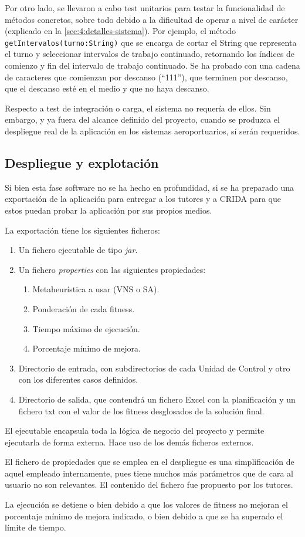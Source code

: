 Por otro lado, se llevaron a cabo test unitarios para testar la funcionalidad de métodos concretos, sobre todo debido a la dificultad de operar a nivel de carácter (explicado en la \autoref{sec:4:detalles-sistema}).
Por ejemplo, el método \texttt{getIntervalos(turno:String)} que se encarga de cortar el String que representa el turno y seleccionar intervalos de trabajo continuado, retornando los índices de comienzo y fin del intervalo de trabajo continuado. Se ha probado con una cadena de caracteres que comienzan por descanso (``111''), que terminen por descanso, que el descanso esté en el medio y que no haya descanso.

Respecto a test de integración o carga, el sistema no requería de ellos. Sin embargo, y ya fuera del alcance definido del proyecto, cuando se produzca el despliegue real de la aplicación en los sistemas aeroportuarios, sí serán requeridos.

\subsection{Despliegue y explotación} 
\label{sec:4:despliegue}

Si bien esta fase software no se ha hecho en profundidad, si se ha preparado una exportación de la aplicación para entregar a los tutores y a \gls{CRIDA} para que estos puedan probar la aplicación por sus propios medios.

La exportación tiene los siguientes ficheros:
\begin{enumerate}
	\item Un fichero ejecutable de tipo \textit{jar}.
	\item Un fichero \textit{properties} con las siguientes propiedades:
	\begin{enumerate}[label*={\arabic*}]
		\item Metaheurística a usar (VNS o SA).
		\item Ponderación de cada fitness.
		\item Tiempo máximo de ejecución.
		\item Porcentaje mínimo de mejora.
	\end{enumerate}
	\item Directorio de entrada, con subdirectorios de cada Unidad de Control y otro con los diferentes casos definidos.
	\item Directorio de salida, que contendrá un fichero Excel con la planificación y un fichero txt con el valor de  los fitness desglosados de la solución final.
\end{enumerate}

El ejecutable encapsula toda la lógica de negocio del proyecto y permite ejecutarla de forma externa. Hace uso de los demás ficheros externos.

El fichero de propiedades que se emplea en el despliegue es una simplificación de aquel empleado internamente, pues tiene muchos más parámetros que de cara al usuario no son relevantes. El contenido del fichero fue propuesto por los tutores.

La ejecución se detiene o bien debido a que los valores de fitness no mejoran el porcentaje mínimo de mejora indicado, o bien debido a que se ha superado el límite de tiempo.
